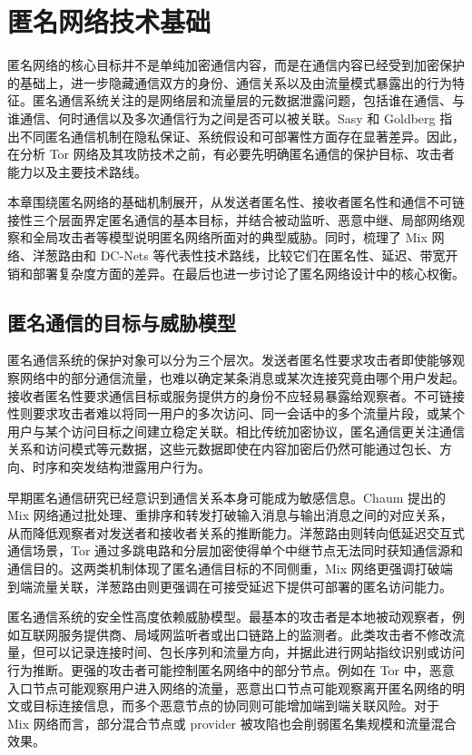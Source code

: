 \section{匿名网络技术基础}

匿名网络的核心目标并不是单纯加密通信内容，而是在通信内容已经受到加密保护的基础上，进一步隐藏通信双方的身份、通信关系以及由流量模式暴露出的行为特征。匿名通信系统关注的是网络层和流量层的元数据泄露问题，包括谁在通信、与谁通信、何时通信以及多次通信行为之间是否可以被关联。Sasy 和 Goldberg 指出不同匿名通信机制在隐私保证、系统假设和可部署性方面存在显著差异\cite{sasy2024sok}。因此，在分析 Tor 网络及其攻防技术之前，有必要先明确匿名通信的保护目标、攻击者能力以及主要技术路线。

本章围绕匿名网络的基础机制展开，从发送者匿名性、接收者匿名性和通信不可链接性三个层面界定匿名通信的基本目标，并结合被动监听、恶意中继、局部网络观察和全局攻击者等模型说明匿名网络所面对的典型威胁。同时，梳理了 Mix 网络、洋葱路由和 DC-Nets 等代表性技术路线，比较它们在匿名性、延迟、带宽开销和部署复杂度方面的差异。在最后也进一步讨论了匿名网络设计中的核心权衡。

\subsection{匿名通信的目标与威胁模型}

匿名通信系统的保护对象可以分为三个层次。发送者匿名性要求攻击者即使能够观察网络中的部分通信流量，也难以确定某条消息或某次连接究竟由哪个用户发起。接收者匿名性要求通信目标或服务提供方的身份不应轻易暴露给观察者。不可链接性则要求攻击者难以将同一用户的多次访问、同一会话中的多个流量片段，或某个用户与某个访问目标之间建立稳定关联。相比传统加密协议，匿名通信更关注通信关系和访问模式等元数据，这些元数据即使在内容加密后仍然可能通过包长、方向、时序和突发结构泄露用户行为。

早期匿名通信研究已经意识到通信关系本身可能成为敏感信息。Chaum 提出的 Mix 网络通过批处理、重排序和转发打破输入消息与输出消息之间的对应关系，从而降低观察者对发送者和接收者关系的推断能力\cite{chaum1981untraceable}。洋葱路由则转向低延迟交互式通信场景，Tor 通过多跳电路和分层加密使得单个中继节点无法同时获知通信源和通信目的\cite{dingledine2004tor}。这两类机制体现了匿名通信目标的不同侧重，Mix 网络更强调打破端到端流量关联，洋葱路由则更强调在可接受延迟下提供可部署的匿名访问能力。

匿名通信系统的安全性高度依赖威胁模型。最基本的攻击者是本地被动观察者，例如互联网服务提供商、局域网监听者或出口链路上的监测者。此类攻击者不修改流量，但可以记录连接时间、包长序列和流量方向，并据此进行网站指纹识别或访问行为推断。更强的攻击者可能控制匿名网络中的部分节点。例如在 Tor 中，恶意入口节点可能观察用户进入网络的流量，恶意出口节点可能观察离开匿名网络的明文或目标连接信息，而多个恶意节点的协同则可能增加端到端关联风险。对于 Mix 网络而言，部分混合节点或 provider 被攻陷也会削弱匿名集规模和流量混合效果。

